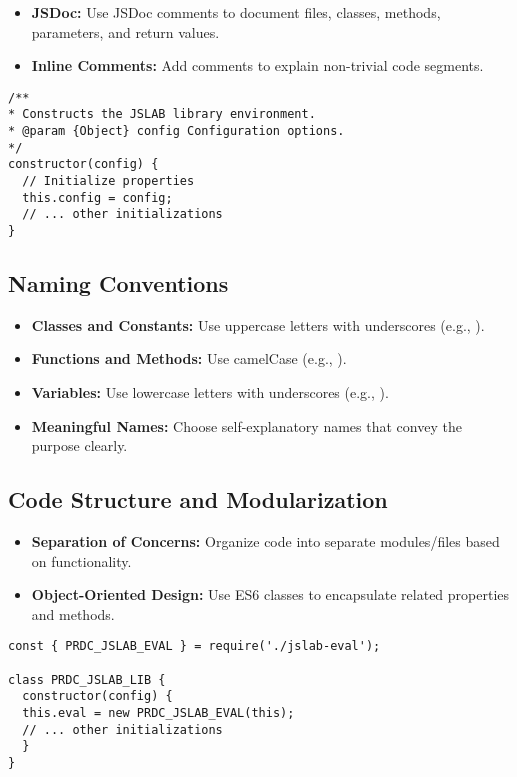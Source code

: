 \documentclass[12pt,a4paper]{article}
\begin{document}
\begin{itemize}
  \item \textbf{JSDoc:} Use JSDoc comments to document files, classes, methods, parameters, and return values.
  
  \item \textbf{Inline Comments:} Add comments to explain non-trivial code segments.
\end{itemize}

\begin{lstlisting}[style=JavaScriptStyle]
/**
* Constructs the JSLAB library environment.
* @param {Object} config Configuration options.
*/
constructor(config) {
  // Initialize properties
  this.config = config;
  // ... other initializations
}
\end{lstlisting}

\subsection{Naming Conventions}
\begin{itemize}
  \item \textbf{Classes and Constants:} Use uppercase letters with underscores (e.g., ).
  
  \item \textbf{Functions and Methods:} Use camelCase (e.g., ).
  
  \item \textbf{Variables:} Use lowercase letters with underscores (e.g., ).
  
  \item \textbf{Meaningful Names:} Choose self-explanatory names that convey the purpose clearly.
\end{itemize}

\subsection{Code Structure and Modularization}
\begin{itemize}
  \item \textbf{Separation of Concerns:} Organize code into separate modules/files based on functionality.
  
  \item \textbf{Object-Oriented Design:} Use ES6 classes to encapsulate related properties and methods.
\end{itemize}

\begin{lstlisting}[style=JavaScriptStyle]
const { PRDC_JSLAB_EVAL } = require('./jslab-eval');

class PRDC_JSLAB_LIB {
  constructor(config) {
  this.eval = new PRDC_JSLAB_EVAL(this);
  // ... other initializations
  }
}
\end{lstlisting}
\end{document}
